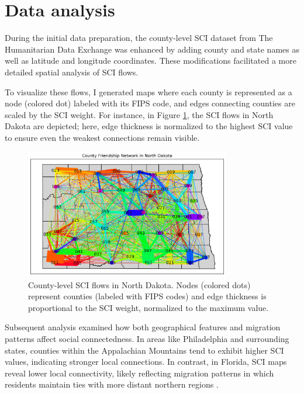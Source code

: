 \section{Data analysis}

During the initial data preparation, the county-level SCI dataset from The Humanitarian Data Exchange \cite{HUMDataSocialConnectedness} was enhanced by adding county and state names as well as latitude and longitude coordinates. These modifications facilitated a more detailed spatial analysis of SCI flows.

To visualize these flows, I generated maps where each county is represented as a node (colored dot) labeled with its FIPS code, and edges connecting counties are scaled by the SCI weight. For instance, in Figure \ref{fig:sci_map}, the SCI flows in North Dakota are depicted; here, edge thickness is normalized to the highest SCI value to ensure even the weakest connections remain visible.

\begin{figure}[h]
    \centering
    \includegraphics[width=0.8\textwidth]{images/network_North Dakota.jpg}
    \caption{County-level SCI flows in North Dakota. Nodes (colored dots) represent counties (labeled with FIPS codes) and edge thickness is proportional to the SCI weight, normalized to the maximum value.}
    \label{fig:sci_map}
\end{figure}

Subsequent analysis examined how both geographical features and migration patterns affect social connectedness. In areas like Philadelphia and surrounding states, counties within the Appalachian Mountains tend to exhibit higher SCI values, indicating stronger local connections. In contrast, in Florida, SCI maps reveal lower local connectivity, likely reflecting migration patterns in which residents maintain ties with more distant northern regions \cite{NairAndris2024}.

